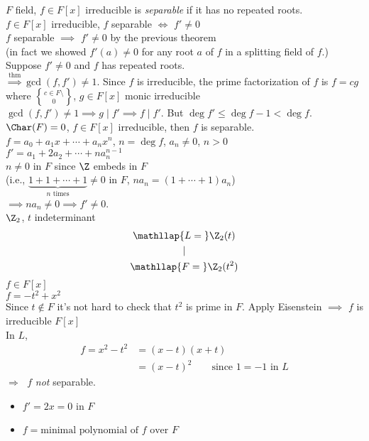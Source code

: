  $F$ field, $f\in F[x]$ irreducible is \emph{separable} if it has no repeated roots. \\
\cor $f\in F[x]$ irreducible, $f$ separable $\iff$ $f'\neq0$ \\
\pf $f$ separable $\implies$ $f'\neq0$ by the previous theorem \\
(in fact we showed $f'(a)\neq0$ for any root $a$ of $f$ in a splitting field of $f$.) \\
Suppose $f'\neq0$ and $f$ has repeated roots. \\
$\overset{\text{thm}}{\Longrightarrow}\gcd(f,f')\neq1$.  Since $f$ is irreducible, the prime factorization of $f$ is $f=cg$ where $c\in F\setminus\brace0$, $g\in F[x]$ monic irreducible \\
$\gcd(f,f')\neq1 \implies g\mid f' \implies f\mid f'$.  But $\deg f'\leq\deg f-1<\deg f$. \\
\cor $\Char(F)=0$, $f\in F[x]$ irreducible, then $f$ is separable. \\
\pf $f=a_0+a_1x+\dotsb+a_nx^n$, $n=\deg f$, $a_n\neq0$, $n>0$ \\
$f'=a_1+2a_2+\dotsb+na_n^{n-1}$ \\
$n\neq0$ in $F$ since $\Z$ embeds in $F$ \\
(i.e., $\underbrace{1+1+\dotsb+1}_\text{$n$ times}\neq0$ in $F$, $na_n=(1+\dotsb+1)a_n$) \\
$\implies na_n\neq0 \implies f'\neq0$. \\
\ex $\Z_2$, $t$ indeterminant
\begin{gather*}
\mathllap{L={}} \Z_2(t) \\
| \\
\mathllap{F={}} \Z_2(t^2)
\end{gather*}
$f\in F[x]$ \\
$f=-t^2+x^2$ \\
Since $t\notin F$ it's not hard to check that $t^2$ is prime in $F$.  Apply Eisenstein $\implies$ $f$ is irreducible $F[x]$ \\
In $L$,
\begin{align*}
f = x^2 - t^2 &= (x-t)(x+t) \\
&= (x-t)^2 \qquad \text{since $1=-1$ in $L$}
\end{align*}
$\Longrightarrow\;$ $f$ \emph{not} separable. \\
\note
\begin{itemize}
\item $f'=2x=0$ in $F$
\item $f=\text{minimal polynomial of $f$ over $F$}$
\end{itemize}

